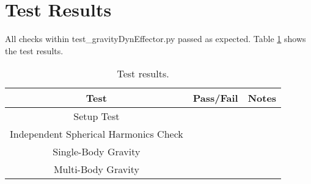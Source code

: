 \section{Test Results}

All checks within test\_gravityDynEffector.py passed as expected. Table \ref{tab:results} shows the test results.\\

\begin{table}[htbp]
	\caption{Test results.}
	\label{tab:results}
	\centering \fontsize{10}{10}\selectfont
	\begin{tabular}{c | c | c  } %
		\hline
		\textbf{Test} 				    & \textbf{Pass/Fail} 						   			           & \textbf{Notes} 									\\ \hline
		Setup Test       			  	&      & 			 \\
		Independent Spherical Harmonics Check  &                  &  \\ 
		Single-Body Gravity		   	&                  &  \\ 
		Multi-Body Gravity			 &  			 	 &   			   \\ \hline
	\end{tabular}
\end{table}